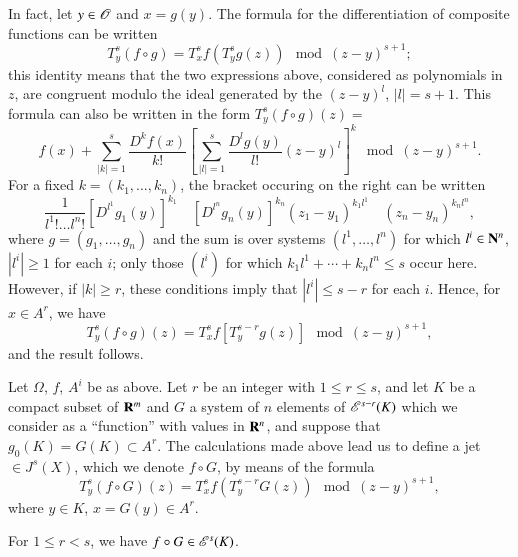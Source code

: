 In fact, let $y\in \mathscr{O}$ and $x=g(y)$. The formula for the differentiation of composite functions can be written
$$
T^{s}_{y}(f\circ g)=T^{s}_{x}f(T^{s}_{y}g(z))\mod (z-y)^{s+1};
$$
this identity means that the two expressions above, considered as polynomials in $z$, are congruent modulo the ideal generated by the $(z-y)^{l}$, $|l|=s+1$. This formula can also be written in the form $T^{s}_{y}(f\circ g)(z)=$
$$
f(x)+\sum\limits^{s}_{|k|=1}\dfrac{D^{k}f(x)}{k!}\left[\sum\limits^{s}_{|l|=1}\dfrac{D^{l}g(y)}{l!}(z-y)^{l}\right]^{k}\mod (z-y)^{s+1}.
$$
For a fixed $k=(k_{1},\ldots,k_{n})$, the bracket occuring on the right can be written
$$
\dfrac{1}{l^{1}!\ldots l^{n}!}[D^{l^{1}}g_{1}(y)]^{k_{1}}\quad [D^{l^{n}}g_{n}(y)]^{k_{n}}(z_{1}-y_{1})^{k_{1}l^{1}}\quad (z_{n}-y_{n})^{k_{n}l^{n}},
$$
where $g=(g_{1},\ldots,g_{n})$ and the sum is over systems $(l^{1},\ldots,l^{n})$ for which $l^{i}\in \mathbf{N}^{n}$, $|l^{i}|\geq 1$ for each $i$; only those $(l^{i})$ for which $k_{1}l^{1}+\cdots + k_{n}l^{n}\leq s$ occur here. However, if $|k|\geq r$, these conditions imply that $|l^{i}|\leq s-r$ for each $i$. Hence, for $x\in A^{r}$, we have 
$$
T^{s}_{y}(f\circ g)(z)=T^{s}_{x}f[T^{s-r}_{y}g(z)]\mod (z-y)^{s+1},
$$
and the result follows.

Let $\Omega$, $f$, $A^{i}$ be as above. Let $r$ be an integer with $1\leq r\leq s$, and let $K$ be a compact subset of $\mathbf{R}^{m}$ and $G$ a system of $n$ elements of $\mathscr{E}^{s-r}(K)$ which we consider as a ``function'' with values in $\mathbf{R}^{n}$, and suppose that $g_{0}(K)=G(K)\subset A^{r}$. The calculations made above lead us to define a jet $\in J^{s}(X)$, which we denote $f\circ G$, by means of the formula
$$
T^{s}_{y}(f\circ G)(z)=T^{s}_{x}f(T^{s-r}_{y}G(z))\mod (z-y)^{s+1},
$$
where $y\in K$, $x=G(y)\in A^{r}$.

\begin{theorem}\label{chap1-thm6.1}
For $1\leq r<s$, we have $f\circ G\in \mathscr{E}^{s}(K)$.
\end{theorem}

